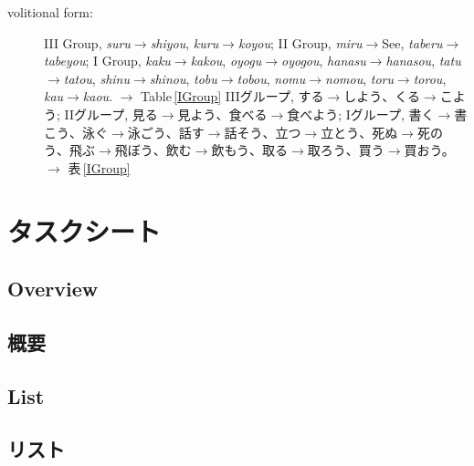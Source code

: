 \documentclass[uplatex,dvipdfmx,b5paper,english,10pt]{jsbook}
\newif\ifTASKSHEETS
\begin{document}
\begin{description}
\item[volitional form:] %
\label{gn:volitional}
\ifEnglish
III Group, {\it suru\/}$\rightarrow${\it shiyou\/}, {\it kuru\/}$\rightarrow${\it koyou\/};
II Group, {\it miru\/}$\rightarrow$See, {\it taberu\/}$\rightarrow${\it tabeyou\/};
I Group, {\it kaku\/}$\rightarrow${\it kakou\/}, {\it oyogu\/}$\rightarrow${\it oyogou\/}, {\it hanasu\/}$\rightarrow${\it hanasou\/}, {\it tatu\/}$\rightarrow${\it tatou\/}, {\it shinu\/}$\rightarrow${\it shinou\/}, {\it tobu\/}$\rightarrow${\it tobou\/}, {\it nomu\/}$\rightarrow${\it nomou\/}, {\it toru\/}$\rightarrow${\it torou\/}, {\it kau\/}$\rightarrow${\it kaou\/}.
$\rightarrow$ Table\,\ref{IGroup}
\else
IIIグループ, する$\rightarrow$しよう、くる$\rightarrow$こよう;
IIグループ, 見る$\rightarrow$見よう、食べる$\rightarrow$食べよう;
Iグループ, 書く$\rightarrow$書こう、泳ぐ$\rightarrow$泳ごう、話す$\rightarrow$話そう、立つ$\rightarrow$立とう、死ぬ$\rightarrow$死のう、飛ぶ$\rightarrow$飛ぼう、飲む$\rightarrow$飲もう、取る$\rightarrow$取ろう、買う$\rightarrow$買おう。
$\rightarrow$ 表\,\ref{IGroup}
\fi
\end{description}
\fi%


\ifTASKSHEETS
\ifEnglish
\chapter{Tasksheets}
\else
\chapter{タスクシート}
\fi

\ifEnglish
\section{Overview}
\else
\section{概要}
\fi

\ifEnglish
\section{List}
\else
\section{リスト}
\fi
\end{document}
